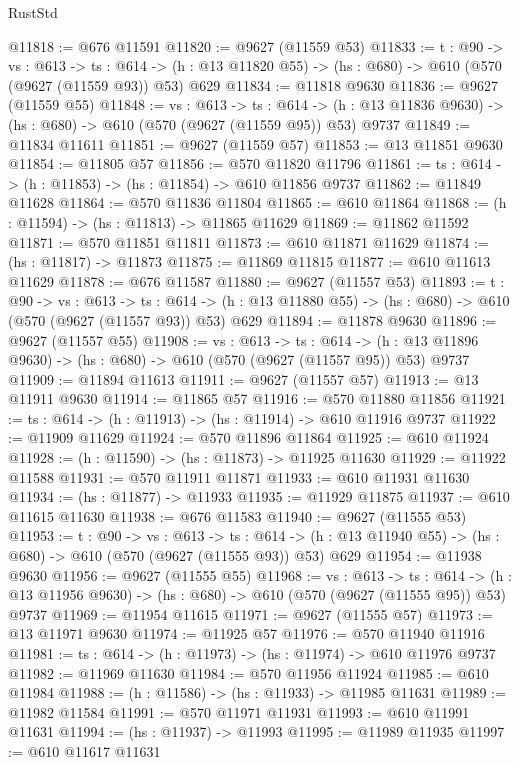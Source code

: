 \begin{lexlean}{RustStd}
\begin{coremodule}
@11818 := @676 @11591
@11820 := @9627 (@11559 @53)
@11833 := {t : @90} ->
  {vs : @613} ->
  {ts : @614} -> (h : @13 @11820 @55) -> (hs : @680) -> @610 (@570 (@9627 (@11559 @93)) @53) @629
@11834 := @11818 @9630
@11836 := @9627 (@11559 @55)
@11848 := {vs : @613} ->
  {ts : @614} -> (h : @13 @11836 @9630) -> (hs : @680) -> @610 (@570 (@9627 (@11559 @95)) @53) @9737
@11849 := @11834 @11611
@11851 := @9627 (@11559 @57)
@11853 := @13 @11851 @9630
@11854 := @11805 @57
@11856 := @570 @11820 @11796
@11861 := {ts : @614} -> (h : @11853) -> (hs : @11854) -> @610 @11856 @9737
@11862 := @11849 @11628
@11864 := @570 @11836 @11804
@11865 := @610 @11864
@11868 := (h : @11594) -> (hs : @11813) -> @11865 @11629
@11869 := @11862 @11592
@11871 := @570 @11851 @11811
@11873 := @610 @11871 @11629
@11874 := (hs : @11817) -> @11873
@11875 := @11869 @11815
@11877 := @610 @11613 @11629
@11878 := @676 @11587
@11880 := @9627 (@11557 @53)
@11893 := {t : @90} ->
  {vs : @613} ->
  {ts : @614} -> (h : @13 @11880 @55) -> (hs : @680) -> @610 (@570 (@9627 (@11557 @93)) @53) @629
@11894 := @11878 @9630
@11896 := @9627 (@11557 @55)
@11908 := {vs : @613} ->
  {ts : @614} -> (h : @13 @11896 @9630) -> (hs : @680) -> @610 (@570 (@9627 (@11557 @95)) @53) @9737
@11909 := @11894 @11613
@11911 := @9627 (@11557 @57)
@11913 := @13 @11911 @9630
@11914 := @11865 @57
@11916 := @570 @11880 @11856
@11921 := {ts : @614} -> (h : @11913) -> (hs : @11914) -> @610 @11916 @9737
@11922 := @11909 @11629
@11924 := @570 @11896 @11864
@11925 := @610 @11924
@11928 := (h : @11590) -> (hs : @11873) -> @11925 @11630
@11929 := @11922 @11588
@11931 := @570 @11911 @11871
@11933 := @610 @11931 @11630
@11934 := (hs : @11877) -> @11933
@11935 := @11929 @11875
@11937 := @610 @11615 @11630
@11938 := @676 @11583
@11940 := @9627 (@11555 @53)
@11953 := {t : @90} ->
  {vs : @613} ->
  {ts : @614} -> (h : @13 @11940 @55) -> (hs : @680) -> @610 (@570 (@9627 (@11555 @93)) @53) @629
@11954 := @11938 @9630
@11956 := @9627 (@11555 @55)
@11968 := {vs : @613} ->
  {ts : @614} -> (h : @13 @11956 @9630) -> (hs : @680) -> @610 (@570 (@9627 (@11555 @95)) @53) @9737
@11969 := @11954 @11615
@11971 := @9627 (@11555 @57)
@11973 := @13 @11971 @9630
@11974 := @11925 @57
@11976 := @570 @11940 @11916
@11981 := {ts : @614} -> (h : @11973) -> (hs : @11974) -> @610 @11976 @9737
@11982 := @11969 @11630
@11984 := @570 @11956 @11924
@11985 := @610 @11984
@11988 := (h : @11586) -> (hs : @11933) -> @11985 @11631
@11989 := @11982 @11584
@11991 := @570 @11971 @11931
@11993 := @610 @11991 @11631
@11994 := (hs : @11937) -> @11993
@11995 := @11989 @11935
@11997 := @610 @11617 @11631

\end{coremodule}
\end{lexlean}
